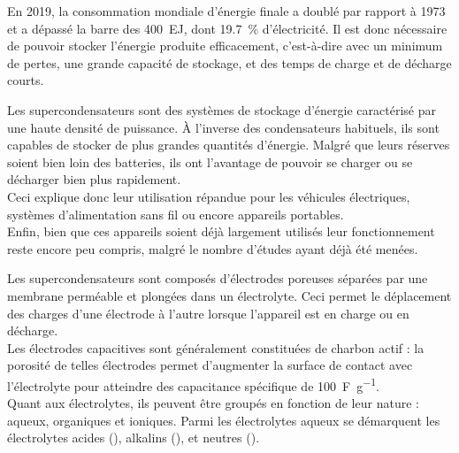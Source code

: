 En 2019, la consommation mondiale d'énergie finale a doublé par rapport à 1973 et a dépassé la barre des \qty{400}{\exa \joule}, dont \qty{19.7}{\percent} d'électricité. %
Il est donc nécessaire de pouvoir stocker l'énergie produite efficacement, c'est-à-dire avec un minimum de pertes, une grande capacité de stockage, et des temps de charge et de décharge courts.

Les supercondensateurs sont des systèmes de stockage d'énergie caractérisé par une haute densité de puissance. À l'inverse des condensateurs habituels, ils sont capables de stocker de plus grandes quantités d'énergie.
Malgré que leurs réserves soient bien loin des batteries, ils ont l'avantage de pouvoir se charger ou se décharger bien plus rapidement.\\
Ceci explique donc leur utilisation répandue pour les véhicules électriques, systèmes d'alimentation sans fil ou encore appareils portables.\\
Enfin, bien que ces appareils soient déjà largement utilisés leur fonctionnement reste encore peu compris, malgré le nombre d'études ayant déjà été menées. %

Les supercondensateurs sont composés d'électrodes poreuses séparées par une membrane perméable et plongées dans un électrolyte. Ceci permet le déplacement des charges d'une électrode à l'autre lorsque l'appareil est en charge ou en décharge.\\
Les électrodes capacitives sont généralement constituées de charbon actif : la porosité de telles électrodes permet d'augmenter la surface de contact avec l'électrolyte pour atteindre des capacitance spécifique de \qty{100}{\farad \per \gram}.\\
Quant aux électrolytes, ils peuvent être groupés en fonction de leur nature : aqueux, organiques et ioniques. Parmi les électrolytes aqueux se démarquent les électrolytes acides (), alkalins (), et neutres ().



